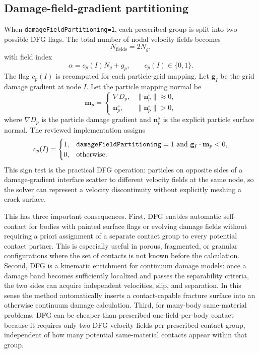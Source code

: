 \subsection{Damage-field-gradient partitioning}
\label{subsec:dfg-contact-partitioning}

When \texttt{damageFieldPartitioning=1}, each prescribed group is split into two possible DFG flags.  The total number of nodal velocity fields becomes
\begin{equation}
  N_{\mathrm{fields}}=2N_g,
\end{equation}
with field index
\begin{equation}
  \alpha = c_p(I)N_g + g_p, \qquad c_p(I)\in\{0,1\}.
  \label{eq:dfg-field-index}
\end{equation}
The flag $c_p(I)$ is recomputed for each particle-grid mapping.  Let $\mathbf{g}_I$ be the grid damage gradient at node $I$.  Let the particle mapping normal be
\begin{equation}
  \mathbf{m}_p =
  \begin{cases}
    \nabla D_p, & \|\mathbf{n}^s_p\|\approx 0,\\
    \mathbf{n}^s_p, & \|\mathbf{n}^s_p\|>0,
  \end{cases}
\end{equation}
where $\nabla D_p$ is the particle damage gradient and $\mathbf{n}^s_p$ is the explicit particle surface normal.  The reviewed implementation assigns
\begin{equation}
  c_p(I)=
  \begin{cases}
    1, & \texttt{damageFieldPartitioning}=1\ \hbox{and}\ \mathbf{g}_I\cdot\mathbf{m}_p < 0,\\
    0, & \hbox{otherwise}.
  \end{cases}
  \label{eq:dfg-contact-flag}
\end{equation}
This sign test is the practical DFG operation: particles on opposite sides of a damage-gradient interface scatter to different velocity fields at the same node, so the solver can represent a velocity discontinuity without explicitly meshing a crack surface.

This has three important consequences.  First, DFG enables automatic self-contact for bodies with painted surface flags or evolving damage fields without requiring a priori assignment of a separate contact group to every potential contact partner.  This is especially useful in porous, fragmented, or granular configurations where the set of contacts is not known before the calculation.  Second, DFG is a kinematic enrichment for continuum damage models: once a damage band becomes sufficiently localized and passes the separability criteria, the two sides can acquire independent velocities, slip, and separation.  In this sense the method automatically inserts a contact-capable fracture surface into an otherwise continuum damage calculation.  Third, for many-body same-material problems, DFG can be cheaper than prescribed one-field-per-body contact because it requires only two DFG velocity fields per prescribed contact group, independent of how many potential same-material contacts appear within that group.

